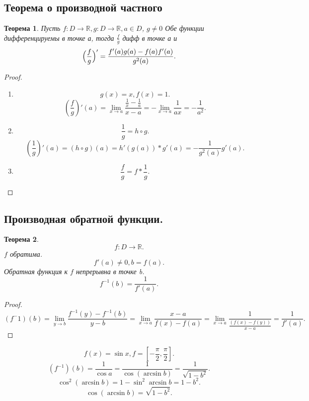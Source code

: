 \documentclass[a4paper]{article}
\newtheorem{theorem}{Теорема}
\begin{document}
\subsection{Теорема о производной частного}
\begin{theorem}
	Пусть $f: D \to \mathbb{R}, g: D \to \mathbb{R}, a \in D$, $g \neq 0$ Обе функции дифференцируемы в точке а, тогда $\frac{f}{g} $ дифф в точке а и
	\[
		\Big{(}\frac{f}{g}\Big{)}' = \frac{f'(a)g(a) - f(a)f'(a)}{g^2(a)}
		.\]
\end{theorem}
\begin{proof}
	\begin{enumerate}
		\item
		      \[
			      g(x) = x, f(x) = 1
			      .\]
		      \[
			      (\frac{f}{g})'(a) = \lim_{x \to a} \frac{\frac{1}{x} - \frac{1}{a}}{x - a} = -\lim_{x \to a} \frac{1}{ax} = -\frac{1}{a^2}
			      .\]
		\item
		      \[
			      \frac{1}{g} = h \circ g
			      .\]
		      \[
			      (\frac{1}{g})'(a) = (h \circ g)(a) = h'(g(a))*g'(a)= -\frac{1}{g^2(a)} g'(a)
			      .\]
		\item
		      \[
			      \frac{f}{g} = f * \frac{1}{g}
			      .\]
	\end{enumerate}
\end{proof}
\subsection{Производная обратной функции.}
\begin{theorem}
	\[
		f : D \to \mathbb{R}
		.\]
	$f$ обратима.
	\[
		f'(a) \neq 0, b = f(a)
		.\]
	Обратная функция к $f$ непрерывна в точке b.
	\[
		f^{-1}(b) = \frac{1}{f'(a)}
		.\]

\end{theorem}
\begin{proof}
	\[
		( f^-1 )(b) = \lim_{y \to b} \frac{f^{-1}(y) - f^{-1}(b)}{y - b} =
		\lim_{x \to a} \frac{x - a}{f(x)  -f(a)} = \lim_{x \to a} \frac{1}{\frac{(f(x) - f(y))}{x - a}}  = \frac{1}{f'(a)}
		.\]
\end{proof}
\[
	f(x) = \sin{x} , f = [-\frac{\pi}{2},\frac{\pi}{2}]
	.\]
\[
	(f^{-1})(b) = \frac{1}{\cos{a}} = \frac{1}{\cos{( \arcsin{b} )}} = \frac{1}{\sqrt{1 - b^2} }
	.\]
\[
	\cos^2{(\arcsin{b})} = 1 - \sin^2{\arcsin{b}} = 1 - b^2
	.\]
\[
	\cos{(\arcsin{b})} = \sqrt{1 - b^2}
	.\]
\end{document}

